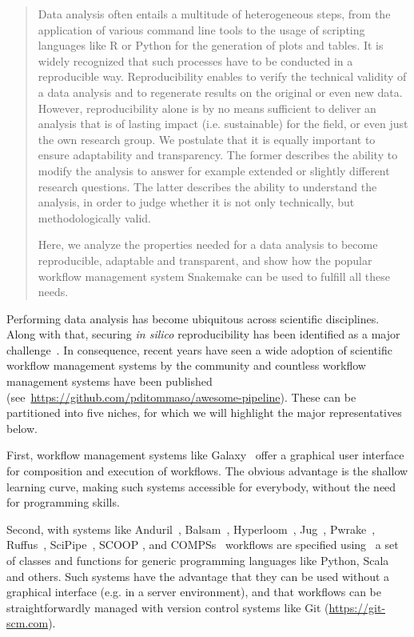 \documentclass[parskip=half]{scrartcl}
\let\plainurl\url
\renewcommand{\url}[1]{\protect\plainurl{#1}}
\begin{document}
\begin{abstract}
	Data analysis often entails a multitude of heterogeneous steps, from the application of various command line tools to the usage of scripting languages like R or Python for the generation of plots and tables.
	It is widely recognized that such processes have to be conducted in a reproducible way.
	Reproducibility enables to verify the technical validity of a data analysis and to regenerate results on the original or even new data.
	However, reproducibility alone is by no means sufficient to deliver an analysis that is of lasting impact (i.e. sustainable) for the field, or even just the own research group.
	We postulate that it is equally important to ensure adaptability and transparency.
	The former describes the ability to modify the analysis to answer for example extended or slightly different research questions.
	The latter describes the ability to understand the analysis, in order to judge whether it is not only technically, but methodologically valid.

	Here, we analyze the properties needed for a data analysis to become reproducible, adaptable and transparent, and show how the popular workflow management system Snakemake can be used to fulfill all these needs.
\end{abstract}

Performing data analysis has become ubiquitous across scientific disciplines.
Along with that, securing \emph{in silico} reproducibility has been identified as a major challenge~\parencite{Mesirov2010,Baker2016,Munaf__2017}.
In consequence, recent years have seen a wide adoption of scientific workflow management systems by the community and countless workflow management systems have been published (see~\url{https://github.com/pditommaso/awesome-pipeline}).
These can be partitioned into five niches, for which we will highlight the major representatives below.

First, workflow management systems like Galaxy~\parencite{Afgan2018} offer a graphical user interface for composition and execution of workflows.
The obvious advantage is the shallow learning curve, making such systems accessible for everybody, without the need for programming skills.

Second, with systems like Anduril~\parencite{Cervera2019}, Balsam~\parencite{papka2018}, Hyperloom~\parencite{cima2018hyperloom}, Jug~\parencite{Coelho_2017}, Pwrake~\parencite{Tanaka_2010}, Ruffus~\parencite{Goodstadt2010}, SciPipe~\parencite{Lampa2019}, SCOOP \parencite{SCOOP_XSEDE2014}, and COMPSs~\parencite{Lordan_2013} workflows are specified using~ a set of classes and functions for generic programming languages like Python, Scala and others.
Such systems have the advantage that they can be used without a graphical interface (e.g. in a server environment), and that workflows can be straightforwardly managed with version control systems like Git (\url{https://git-scm.com}).~
\end{document}
